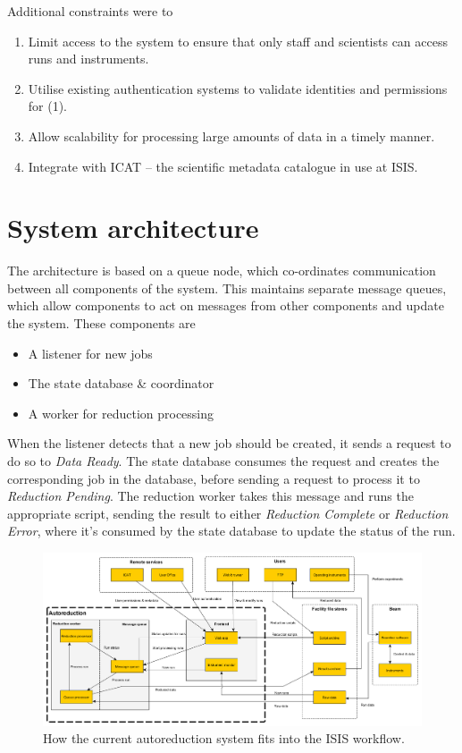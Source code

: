 \documentclass[twocolumn]{article}
\begin{document}
Additional constraints were to

\begin{enumerate}
\item
  Limit access to the system to ensure that only staff and scientists
  can access runs and instruments.
\item
  Utilise existing authentication systems to validate identities and
  permissions for (1).
\item
  Allow scalability for processing large amounts of data in a timely
  manner.
\item
  Integrate with ICAT\cite{icat} -- the scientific metadata catalogue in use
  at ISIS.
\end{enumerate}

\section{System architecture}\label{system-architecture}

The architecture is based on a queue node, which co-ordinates
communication between all components of the system. This maintains
separate message queues, which allow components to act on messages from
other components and update the system. These components are

\begin{itemize}[noitemsep]
\item
  A listener for new jobs
\item
  The state database \& coordinator
\item
  A worker for reduction processing
\end{itemize}

When the listener detects that a new job should be created, it sends a
request to do so to \emph{Data Ready}. The state database consumes the
request and creates the corresponding job in the database, before
sending a request to process it to \emph{Reduction Pending}. The reduction
worker takes this message and runs the appropriate script, sending the
result to either \emph{Reduction Complete} or \emph{Reduction Error},
where it's consumed by the state database to update the status of the
run.

\begin{figure}
\centering\includegraphics[width=1.15\linewidth,angle=90,origin=c]{system.png}
\caption{How the current autoreduction system fits into the ISIS workflow.}
\end{figure}
\end{document}
